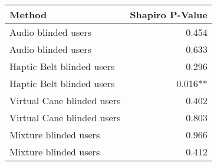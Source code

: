
\centering
\begin{tabular}{lr}
\toprule
                    Method & Shapiro P-Value \\
\midrule
       Audio blinded users &           0.454 \\
       Audio blinded users &           0.633 \\
 Haptic Belt blinded users &           0.296 \\
 Haptic Belt blinded users &         0.016** \\
Virtual Cane blinded users &           0.402 \\
Virtual Cane blinded users &           0.803 \\
     Mixture blinded users &           0.966 \\
     Mixture blinded users &           0.412 \\
\bottomrule
\end{tabular}
